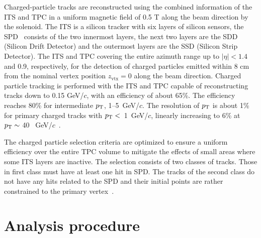 Charged-particle tracks are reconstructed using the combined information of the ITS and TPC in a uniform magnetic field of 0.5 T along the beam direction by the solenoid. The ITS is a silicon tracker with six layers of silicon sensors, the SPD~\cite{Santoro2009:ALICESPD} consists of the two innermost layers, the next two layers are the SDD (Silicon Drift Detector) and the outermost layers are the SSD (Silicon Strip Detector). The ITS and TPC covering the entire azimuth range up to $|\eta|<1.4$ and 0.9, respectively, for the detection of charged particles emitted within 8 cm from the nominal vertex position $z_\mathrm{vtx}=0$ along the beam direction. Charged particle tracking is performed with the ITS and TPC capable of reconstructing tracks down to 0.15 GeV/$c$, with an efficiency of about 65\%. The efficiency reaches 80\% for intermediate $p_\mathrm{T}$, 1--5~GeV/$c$. The resolution of $p_\mathrm{T}$ is about 1\% for primary charged tracks with $p_\mathrm{T}<$~1~GeV/$c$, linearly increasing to 6\% at $p_\mathrm{T}\sim$ 40~ GeV/$c$~\cite{Contin_2012:ITSPTRES}. 

The charged particle selection criteria are optimized to ensure a uniform efficiency over the entire TPC volume to mitigate the effects of small areas where some ITS layers are inactive. The selection consists of two classes of tracks. Those in first class must have at least one hit in SPD. The tracks of the second class do not have any hits related to the SPD and their initial points are rather constrained to the primary vertex~\cite{Adam:2015ewa}. 

\section{Analysis procedure}
\label{sec:ana}
